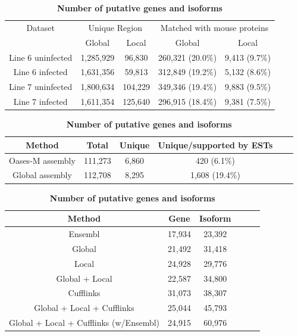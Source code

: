 \documentclass[10pt]{article}
\begin{document}
\begin{table}[!ht]
\caption{
\bf{Unique regions from global and local assembly}}
\begin{tabular}{ccccc}
\hline
Dataset & \multicolumn{2}{c}{Unique Region} & \multicolumn{2}{c}{Matched with mouse proteins}\\
 & Global & Local & Global & Local\\
\hline
Line 6 uninfected & 1,285,929 & 96,830 & 260,321 (20.0\%) & 9,413 (9.7\%)\\
Line 6 infected & 1,631,356 & 59,813 & 312,849 (19.2\%)& 5,132 (8.6\%)\\
Line 7 uninfected & 1,800,634 & 104,229 & 349,346 (19.4\%) & 9,883 (9.5\%)\\
Line 7 infected & 1,611,354 & 125,640 & 296,915 (18.4\%)& 9,381 (7.5\%)\\
\hline
\end{tabular}
\label{unique_sequences_matched_mouse}

\caption{
\bf{Number of total and unique splice junctions}}
\begin{tabular}{cccccc}
\hline
Method& Total & Unique & Unique/supported by ESTs \\ 
\hline
Oases-M assembly & 111,273 & 6,860 & 420 (6.1\%) \\
Global assembly & 112,708 & 8,295 & 1,608 (19.4\%) \\
\hline
\end{tabular}
\label{Oases-M}

\caption{
\bf{Number of putative genes and isoforms}}
\begin{tabular}{cccccc}
\hline
Method& Gene & Isoform \\ 
\hline
Ensembl & 17,934 & 23,392 \\
Global & 21,492 & 31,418 \\
Local & 24,928 & 29,776 \\
Global + Local & 22,587 & 34,800 \\
Cufflinks & 31,073 & 38,307 \\
Global + Local + Cufflinks & 25,044 & 45,793 \\
Global + Local + Cufflinks (w/Ensembl) & 24,915 & 60,976 \\
\hline
\end{tabular}
\label{genes_transcripts}

\end{table}
\end{document}
